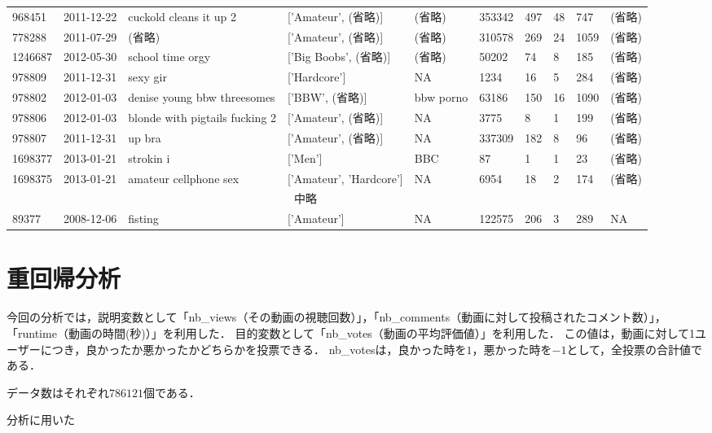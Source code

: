 \documentclass[uplatex]{jsarticle}
\begin{document}
\begin{landscape}
\begin{table}[htb]
\begin{center}
\begin{tabular}{llllllllll}
    968451 & 2011-12-22 & cuckold cleans it up 2 & ['Amateur', (省略)] & (省略) & 353342 & 497 & 48 & 747 & (省略) \\
    778288 & 2011-07-29 & (省略) & ['Amateur', (省略)] & (省略) & 310578 & 269 & 24 & 1059 & (省略) \\
    1246687 & 2012-05-30 & school time orgy & ['Big Boobs', (省略)] & (省略) & 50202 & 74 & 8 & 185 & (省略) \\
    978809 & 2011-12-31 & sexy gir & ['Hardcore'] & NA & 1234 & 16 & 5 & 284 & (省略) \\
    978802 & 2012-01-03 & denise young bbw threesomes & ['BBW', (省略)] & bbw porno & 63186 & 150 & 16 & 1090 & (省略) \\
    978806 & 2012-01-03 & blonde with pigtails fucking 2 & ['Amateur', (省略)] & NA & 3775 & 8 & 1 & 199 & (省略) \\
    978807 & 2011-12-31 & up bra & ['Amateur', (省略)] & NA & 337309 & 182 & 8 & 96 & (省略) \\
    1698377 & 2013-01-21 & strokin i & ['Men'] & BBC  & 87 & 1 & 1 & 23 & (省略) \\
    1698375 & 2013-01-21 & amateur cellphone sex & ['Amateur', 'Hardcore'] & NA & 6954 & 18 & 2 & 174 & (省略) \\

    \multicolumn{9}{c}{中略} \\
    89377 & 2008-12-06 & fisting & ['Amateur'] & NA & 122575 & 206 & 3 & 289 & NA \\
    \hline
    \end{tabular}
\label{tab:dataset}
\end{center}
\end{table}
\end{landscape}


\section{重回帰分析}

今回の分析では，説明変数として「nb\_views（その動画の視聴回数）」，「nb\_comments（動画に対して投稿されたコメント数）」，「runtime（動画の時間(秒)）」を利用した．
目的変数として「nb\_votes（動画の平均評価値）」を利用した．
この値は，動画に対して1ユーザーにつき，良かったか悪かったかどちらかを投票できる．
nb\_votesは，良かった時を$1$，悪かった時を$-1$として，全投票の合計値である．

データ数はそれぞれ$786121$個である．

分析に用いた
\end{document}
